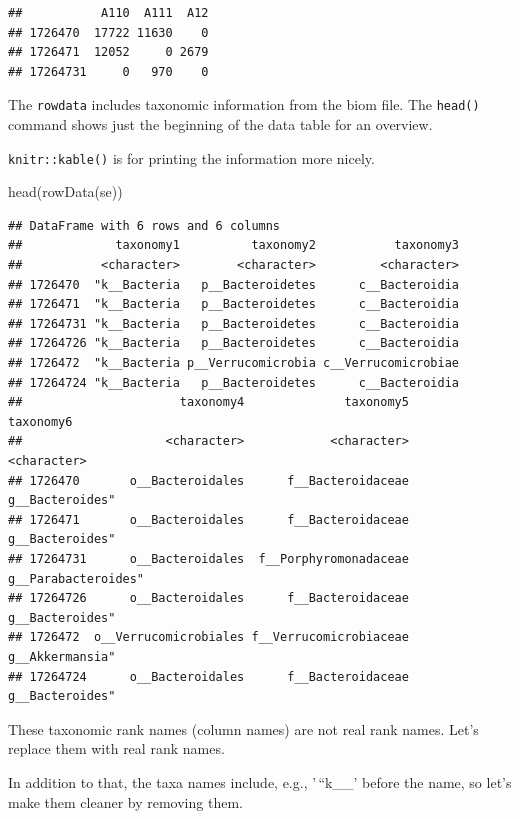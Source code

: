 \documentclass[
]{book}
\newenvironment{Shaded}{\begin{snugshade}}{\end{snugshade}}
\newcommand{\FunctionTok}[1]{\textcolor[rgb]{0.00,0.00,0.00}{#1}}
\newcommand{\NormalTok}[1]{#1}
\begin{document}
\begin{verbatim}
##           A110  A111  A12
## 1726470  17722 11630    0
## 1726471  12052     0 2679
## 17264731     0   970    0
\end{verbatim}

The \texttt{rowdata} includes taxonomic information from the biom file. The \texttt{head()} command
shows just the beginning of the data table for an overview.

\texttt{knitr::kable()} is for printing the information more nicely.

\begin{Shaded}
\begin{Highlighting}[]
\FunctionTok{head}\NormalTok{(}\FunctionTok{rowData}\NormalTok{(se))}
\end{Highlighting}
\end{Shaded}

\begin{verbatim}
## DataFrame with 6 rows and 6 columns
##             taxonomy1          taxonomy2           taxonomy3
##           <character>        <character>         <character>
## 1726470  "k__Bacteria   p__Bacteroidetes      c__Bacteroidia
## 1726471  "k__Bacteria   p__Bacteroidetes      c__Bacteroidia
## 17264731 "k__Bacteria   p__Bacteroidetes      c__Bacteroidia
## 17264726 "k__Bacteria   p__Bacteroidetes      c__Bacteroidia
## 1726472  "k__Bacteria p__Verrucomicrobia c__Verrucomicrobiae
## 17264724 "k__Bacteria   p__Bacteroidetes      c__Bacteroidia
##                      taxonomy4              taxonomy5           taxonomy6
##                    <character>            <character>         <character>
## 1726470       o__Bacteroidales      f__Bacteroidaceae     g__Bacteroides"
## 1726471       o__Bacteroidales      f__Bacteroidaceae     g__Bacteroides"
## 17264731      o__Bacteroidales  f__Porphyromonadaceae g__Parabacteroides"
## 17264726      o__Bacteroidales      f__Bacteroidaceae     g__Bacteroides"
## 1726472  o__Verrucomicrobiales f__Verrucomicrobiaceae     g__Akkermansia"
## 17264724      o__Bacteroidales      f__Bacteroidaceae     g__Bacteroides"
\end{verbatim}

These taxonomic rank names (column names) are not real rank
names. Let's replace them with real rank names.

In addition to that, the taxa names include, e.g., '\,``k\_\_' before the name, so let's
make them cleaner by removing them.
\end{document}
